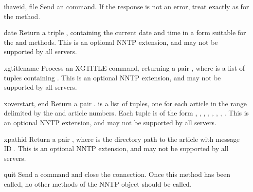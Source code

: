 \begin{funcdesc}{ihave}{id, file}
Send an  command.  If the response is not an error, treat
 exactly as for the  method.
\end{funcdesc}

\begin{funcdesc}{date}{}
Return a triple ,
containing the current date and time in a form suitable for the
 and  methods.
This is an optional NNTP extension, and may not be supported by all
servers.
\end{funcdesc}

\begin{funcdesc}{xgtitle}{name}
Process an XGTITLE command, returning a pair , where  is a list of tuples containing
.
This is an optional NNTP extension, and may not be supported by all
servers.
\end{funcdesc}

\begin{funcdesc}{xover}{start, end}
Return a pair .   is a list
of tuples, one for each article in the range delimited by the 
and  article numbers.  Each tuple is of the form
\code{(}, , , , , , , \code{)}.
This is an optional NNTP extension, and may not be supported by all
servers.
\end{funcdesc}

\begin{funcdesc}{xpath}{id}
Return a pair , where  is the
directory path to the article with message ID .  This is an
optional NNTP extension, and may not be supported by all servers.
\end{funcdesc}

\begin{funcdesc}{quit}{}
Send a  command and close the connection.  Once this method
has been called, no other methods of the NNTP object should be called.
\end{funcdesc}

